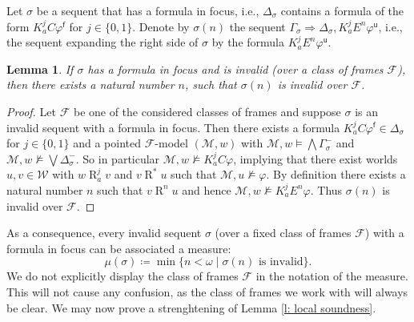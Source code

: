 \documentclass{myifcolog}
\newcommand\C {C}
\newcommand{\K}{K}
\newcommand{\agi}{a}
\newcommand{\E}{E}
\newcommand{\fw}{\mathcal{M}}
\newcommand{\Rel}{\mathrel{R}}
\newcommand{\f}{\mathsf{f}}
\renewcommand{\u}{\mathsf{u}}
\newcommand{\W}{\mathcal{W}}
\newtheorem{lemma}[theorem]{Lemma}
\numberwithin{theorem}{section}
\begin{document}
Let $\sigma$ be a sequent that has a formula in focus, i.e., $\Delta_\sigma$ contains a formula of the form $\K_\agi^j \C \varphi^\f$ for $j \in \{0,1\}$. Denote by $\sigma(n)$ the sequent $\Gamma_\sigma \Rightarrow \Delta_\sigma, \K_\agi^j \E^n \varphi^\u$, i.e., the sequent expanding the right side of $\sigma$ by the formula $\K_\agi^j \E^n \varphi^\u$. 
\begin{lemma}\label{l: invalid sequent with formula in focus}
    If $\sigma$ has a formula in focus and is invalid (over a class of frames $\mathscr{F}$), then there exists a natural number $n$, such that $\sigma(n)$ is invalid over $\mathscr{F}$.
\end{lemma}
\begin{proof}
Let $\mathscr{F}$ be one of the considered classes of frames and suppose $\sigma$ is an invalid sequent with a formula in focus. Then there exists a formula $\K_\agi^j \C \varphi^\f \in \Delta_\sigma$ for $j \in \{0,1\}$ and a pointed $\mathscr{F}$-model $(\fw,w)$ with $\fw,w  \models \bigwedge \Gamma_\sigma^-$ and $\fw,w \not \models \bigvee \Delta_\sigma^-$. So in particular $\fw,w \not \models \K_\agi^j \C \varphi$, implying that there exist worlds $u,v \in \W$ with $w \Rel_\agi^j v$ and $v \Rel^\ast u$ such that $\fw, u \not \models \varphi$. By definition there exists a natural number $n$ such that $v \Rel^n u$ and hence $\fw, w \not \models \K_\agi^j \E^n \varphi$. Thus $\sigma(n)$ is invalid over $\mathscr{F}$.
\end{proof}


As a consequence, every invalid sequent $\sigma$ (over a fixed class of frames $\mathscr{F}$) with a formula in focus can be associated a measure:
\begin{equation*}
    \mu(\sigma) \coloneqq \min \{n < \omega \mid \sigma(n) \text{ is invalid}\}.
\end{equation*}
We do not explicitly display the class of frames $\mathscr{F}$ in the notation of the measure. This will not cause any confusion, as the class of frames we work with will always be clear. We may now prove a strenghtening of Lemma \ref{l: local soundness}.
\end{document}
